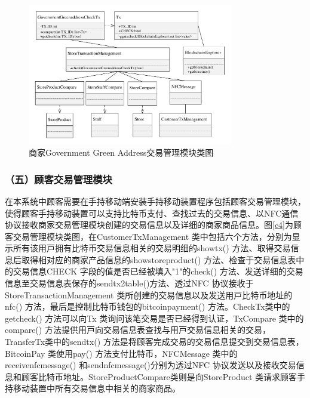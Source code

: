 	

	\begin{figure}[!htbp]
		\centering
		\includegraphics[width = 0.8\textwidth]{c7.pdf}
		\caption{商家Government Green Address交易管理模块类图}\label{c7}
	\end{figure}



\subsubsection{（五）顾客交易管理模块}
在本系统中顾客需要在手持移动端安装手持移动装置程序包括顾客交易管理模块，使得顾客手持移动装置可以支持比特币支付、查找过去的交易信息、以NFC通信协议接收商家交易管理模块创建的交易信息以及详细的商家商品信息。图\ref{c4}为顾客交易管理模块类图，在CustomerTxManagement 类中包括六个⽅法，分别为显⽰所有该⽤⼾拥有⽐特币交易信息相关的交易明细的showtx() ⽅法、取得交易信息后取得相对应的商家产品信息的showstoreproduct() ⽅法、检查于交易信息表中的交易信息CHECK 字段的值是否已经被填⼊"1"的check() ⽅法、发送详细的交易信息⾄交易信息表保存的sendtx2table()⽅法、透过NFC 协议接收于StoreTransactionManagement 类所创建的交易信息以及发送⽤⼾⽐特币地址的nfc() ⽅法，最后是控制⽐特币钱包的bitcoinpayment() ⽅法。CheckTx类中的getcheck() ⽅法可以向Tx 类询问该笔交易是否已经得到认证，TxCompare 类中的compare() ⽅法提供⽤⼾向交易信息表查找与⽤⼾交易信息相关的交易，TransferTx类中的sendtx() ⽅法是将顾客完成交易的交易信息提交到交易信息表，BitcoinPay 类使⽤pay() ⽅法⽀付⽐特币，NFCMessage 类中的receivenfcmessage() 和sendnfcmessage()分别为透过NFC 协议发送以及接收交易信息和顾客⽐特币地址。StoreProductCompare类则是向StoreProduct 类请求顾客手持移动装置中所有交易信息中相关的商家商品。

